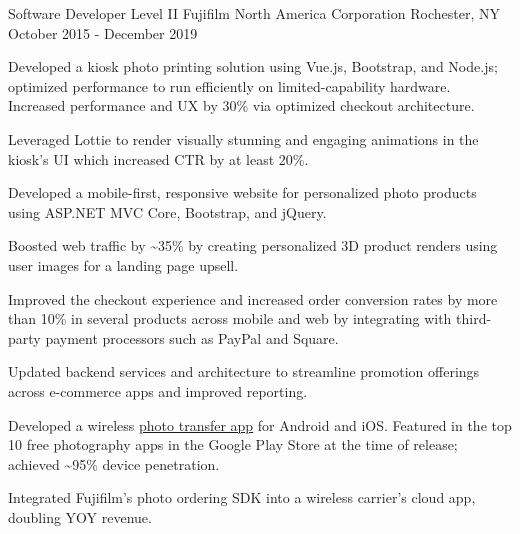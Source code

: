 \begin{cventries}
  \cventry
    {Software Developer Level II} %
    {Fujifilm North America Corporation} %
    {Rochester, NY} %
    {October 2015 - December 2019} %
    {
      \begin{cvitems} %
        \item {Developed a kiosk photo printing solution using Vue.js, Bootstrap, and Node.js; optimized performance to run efficiently on limited-capability hardware. Increased performance and UX by 30\% via optimized checkout architecture.}
        \item {Leveraged Lottie to render visually stunning and engaging animations in the kiosk's UI which increased CTR by at least 20\%.}
        \item {Developed a mobile-first, responsive website for personalized photo products using ASP.NET MVC Core, Bootstrap, and jQuery.}
        \item {Boosted web traffic by \textasciitilde35\% by creating personalized 3D product renders using user images for a landing page upsell.}
        \item {Improved the checkout experience and increased order conversion rates by more than 10\% in several products across mobile and web by integrating with third-party payment processors such as PayPal and Square.}
        \item {Updated backend services and architecture to streamline promotion offerings across e-commerce apps and improved reporting.}
        \item {Developed a wireless \href{https://play.google.com/store/apps/details?id=com.fujifilm.wifi}{photo transfer app} for Android and iOS. Featured in the top 10 free photography apps in the Google Play Store at the time of release; achieved \textasciitilde95\% device penetration.}
        \item {Integrated Fujifilm's photo ordering SDK into a wireless carrier's cloud app, doubling YOY revenue.}
      \end{cvitems}
    }


\end{cventries}
